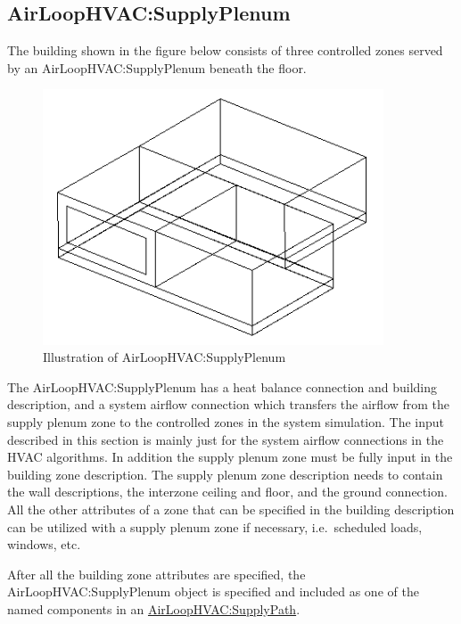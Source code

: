 \subsection{AirLoopHVAC:SupplyPlenum}\label{airloophvacsupplyplenum}

The building shown in the figure below consists of three controlled zones served by an AirLoopHVAC:SupplyPlenum beneath the floor.

\begin{figure}[hbtp] %
\centering
\includegraphics[width=0.9\textwidth, height=0.9\textheight, keepaspectratio=true]{media/image338.png}
\caption{Illustration of AirLoopHVAC:SupplyPlenum \protect \label{fig:illustration-of-airloophvac-supplyplenum}}
\end{figure}

The AirLoopHVAC:SupplyPlenum has a heat balance connection and building description, and a system airflow connection which transfers the airflow from the supply plenum zone to the controlled zones in the system simulation. The input described in this section is mainly just for the system airflow connections in the HVAC algorithms. In addition the supply plenum zone must be fully input in the building zone description. The supply plenum zone description needs to contain the wall descriptions, the interzone ceiling and floor, and the ground connection. All the other attributes of a zone that can be specified in the building description can be utilized with a supply plenum zone if necessary, i.e.~scheduled loads, windows, etc.

After all the building zone attributes are specified, the AirLoopHVAC:SupplyPlenum object is specified and included as one of the named components in an \hyperref[airloophvacsupplypath]{AirLoopHVAC:SupplyPath}.

